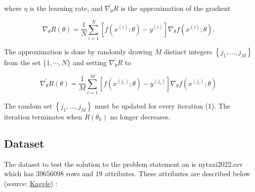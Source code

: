\documentclass{article}
\begin{document}
where $\eta$ is the learning rate, and $\widetilde{\nabla_{\theta} R}$ is the approximation of the gradient

$$
\nabla_{\theta} R(\theta)=\frac{1}{N} \sum_{i=1}^{N}\left[f\left(x^{(i)} ; \theta\right)-y^{(i)}\right] \nabla_{\theta} f\left(x^{(i)} ; \theta\right) .
$$

The approximation is done by randomly drawing $M$ distinct integers $\left\{j_{1}, \ldots, j_{M}\right\}$ from the set $\{1, \cdots, N\}$ and setting $\widetilde{\nabla_{\theta} R}$ to

$$
\widetilde{\nabla_{\theta} R}(\theta)=\frac{1}{M} \sum_{i=1}^{M}\left[f\left(x^{\left(j_{i}\right)} ; \theta\right)-y^{\left(j_{i}\right)}\right] \nabla_{\theta} f\left(x^{\left(j_{i}\right)} ; \theta\right)
$$

The random set $\left\{j_{1}, \ldots, j_{M}\right\}$ must be updated for every iteration (1). The iteration terminates when $R\left(\theta_{k}\right)$ no longer decreases.

\subsection{Dataset}
The dataset to test the solution to the problem statement on is nytaxi2022.csv which has $39656098$ rows and $19$ attributes. These attributes are described below (source: \href{https://www.kaggle.com/datasets/diishasiing/revenue-for-cab-drivers}{Kaggle}) :
\end{document}
